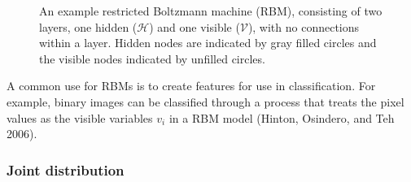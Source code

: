 \documentclass[AMS,STIX1COL]{WileyNJD-v2}
\begin{document}
\begin{figure}
  \centering
  \resizebox{\linewidth}{!}{}
  \caption{An example restricted Boltzmann machine (RBM), consisting of two layers, one hidden ($\mathcal{H}$) and one visible ($\mathcal{V}$), with no connections within a layer. Hidden nodes are indicated by gray filled circles and the visible nodes indicated by unfilled circles.}
  \label{fig:rbm}
\end{figure}

A common use for RBMs is to create features for use in classification.
For example, binary images can be classified through a process that
treats the pixel values as the visible variables \(v_i\) in a RBM model
(Hinton, Osindero, and Teh 2006).

\hypertarget{joint-distribution}{%
\subsubsection{Joint distribution}\label{joint-distribution}}
\end{document}
